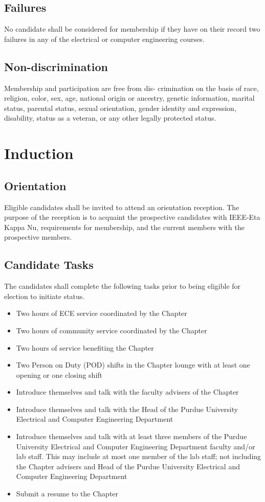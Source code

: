 \documentclass[10pt, oneside]{article}
\begin{document}
\subsection{Failures}
No candidate shall be considered for membership if they have on their record two failures in any of the electrical or computer engineering courses.
\subsection{Non-discrimination}
Membership and participation are free from dis- crimination on the basis of race, religion, color, sex, age, national origin or ancestry, genetic information, marital status, parental status, sexual orientation, gender identity and expression, disability, status as a veteran, or any other legally protected status.

\section{Induction}
\subsection{Orientation}
Eligible candidates shall be invited to attend an orientation reception. The purpose of the reception is to acquaint the prospective candidates with IEEE-Eta Kappa Nu, requirements for membership, and the current members with the prospective members.
\subsection{Candidate Tasks}
The candidates shall complete the following tasks prior to being eligible for election to initiate status.
\begin{itemize}
\item Two hours of ECE service coordinated by the Chapter
\item Two hours of community service coordinated by the Chapter
\item Two hours of service benefiting the Chapter
\item Two Person on Duty (POD) shifts in the Chapter lounge with at least one opening
or one closing shift
\item Introduce themselves and talk with the faculty advisers of the Chapter
\item Introduce themselves and talk with the Head of the Purdue University Electrical
and Computer Engineering Department
\item Introduce themselves and talk with at least three members of the Purdue University
Electrical and Computer Engineering Department faculty and/or lab staff. This may include at most one member of the lab staff; not including the Chapter advisers and Head of the Purdue University Electrical and Computer Engineering Department
\item Submit a resume to the Chapter
\end{itemize}
\end{document}
